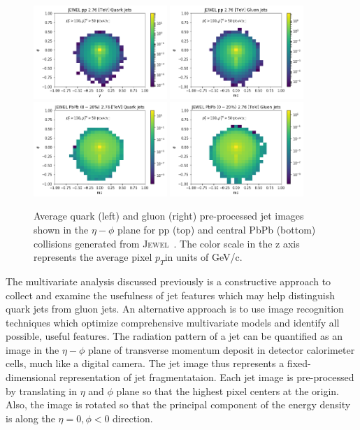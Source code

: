 \documentclass[notoc]{JHEP3}
\newcommand{\pt}{$p_{T}$}
\newcommand{\jw}{\textsc{Jewel}~}
\begin{document}
\begin{figure}[t]
\centering
\includegraphics[width=0.45\textwidth]{plots/jewel_pp_avgQuarkJet}
\includegraphics[width=0.45\textwidth]{plots/jewel_pp_avgGluonJet}
\includegraphics[width=0.45\textwidth]{plots/jewel_pbpb020_avgQuarkJet}
\includegraphics[width=0.45\textwidth]{plots/jewel_pbpb020_avgGluonJet}
\caption{Average quark (left) and gluon (right) pre-processed jet images shown in the $\eta-\phi$ plane for pp (top) and central PbPb (bottom) collisions generated from \jw. The color scale in the z axis represents the average pixel \pt in units of GeV/c. }
\label{fig:qgjetimages}
\end{figure}

The multivariate analysis discussed previously is a constructive approach to collect and examine the usefulness of jet features which may help distinguish quark jets from gluon jets. An alternative approach is to use image recognition techniques which optimize comprehensive multivariate models and identify all possible, useful features. The radiation pattern of a jet can be quantified as an image in the $\eta-\phi$ plane of transverse momentum deposit in detector calorimeter cells, much like a digital camera. The jet image thus represents a fixed-dimensional representation of jet fragmentataion. Each jet image is pre-processed \cite{deOliveira:2015xxd} by translating in $\eta$ and $\phi$ plane so that the highest pixel centers at the origin. Also, the image is rotated so that the principal component of the energy density is along the $\eta=0, \phi<0$ direction. 
 
\end{document}
